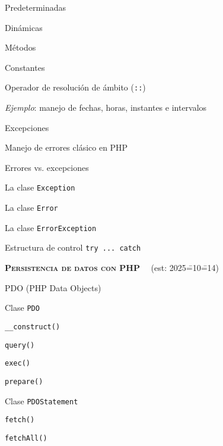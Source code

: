 \begin{longenum}
\begin{longenum}
\begin{longenum}
            \item Predeterminadas
            \item Dinámicas
        \end{longenum}
        \item Métodos
        \item Constantes
        \begin{longenum}
            \item Operador de resolución de ámbito (\texttt{::})
        \end{longenum}
        \item \textit{Ejemplo}: manejo de fechas, horas, instantes e intervalos
        \item Excepciones
        \begin{longenum}
            \item Manejo de errores clásico en PHP
            \item Errores vs. excepciones
            \item La clase \texttt{Exception}
            \item La clase \texttt{Error}
            \item La clase \texttt{ErrorException}
            \item Estructura de control \texttt{try ... catch}
        \end{longenum}
    \end{longenum}
    \item \textbf{\textsc{Persistencia de datos con PHP}} \ \ (est: 2025\==10\==14)
    \begin{longenum}
        \item PDO (PHP Data Objects)
        \begin{longenum}
            \item Clase \texttt{PDO}
            \begin{longenum}
                \item \texttt{\_\_construct()}
                \item \texttt{query()}
                \item \texttt{exec()}
                \item \texttt{prepare()}
            \end{longenum}
            \item Clase \texttt{PDOStatement}
            \begin{longenum}
                \item \texttt{fetch()}
                \item \texttt{fetchAll()}

\end{longenum}
\end{longenum}
\end{longenum}
\end{longenum}
